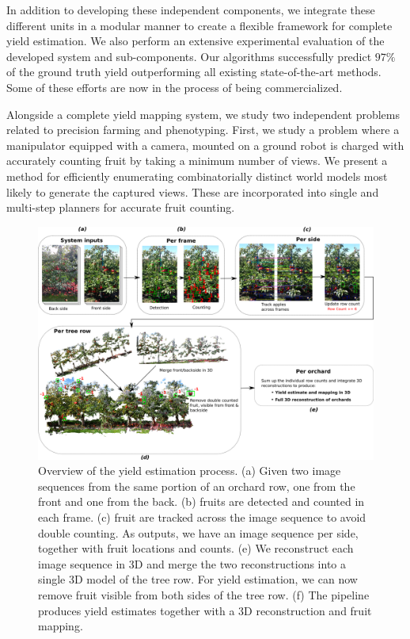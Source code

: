 In addition to developing these independent components, we integrate these different units in a modular manner to create a flexible framework for complete yield estimation. We also perform an extensive experimental evaluation of the developed system and sub-components. Our algorithms successfully predict $97\%$ of the ground truth yield outperforming all existing state-of-the-art methods. Some of these efforts are now in the process of being commercialized.



Alongside a complete yield mapping system, we study two independent problems related to precision farming and phenotyping. First, we study a problem where a manipulator equipped with a camera, mounted on a ground robot is charged with accurately counting fruit by taking a minimum number of views. We present a method for efficiently enumerating combinatorially distinct world models most likely to generate the captured views. These are incorporated into single and multi-step planners for accurate fruit counting. 
\begin{figure}[ht!]
    \centering
    \includegraphics[width=\textwidth]{figures/prelim/conceptFigure.png}
    \caption[Overview of the yield estimation process.]{Overview of the yield estimation process. (a) Given two image sequences from the same portion of an orchard row, one from the front and one from the back. (b) fruits are detected and counted in each frame. (c) fruit are tracked across the image sequence to avoid double counting. As outputs, we have an image sequence per side, together with fruit locations and counts. (e) We reconstruct each image sequence in 3D and merge the two reconstructions into a single 3D model of the tree row. For yield estimation, we can now remove fruit visible from both sides of the tree row. (f) The pipeline produces yield estimates together with a 3D reconstruction and fruit mapping.}
    \label{fig:concept}
\end{figure}

